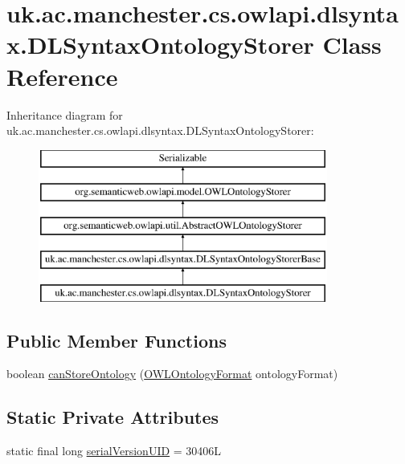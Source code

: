 \hypertarget{classuk_1_1ac_1_1manchester_1_1cs_1_1owlapi_1_1dlsyntax_1_1_d_l_syntax_ontology_storer}{\section{uk.\-ac.\-manchester.\-cs.\-owlapi.\-dlsyntax.\-D\-L\-Syntax\-Ontology\-Storer Class Reference}
\label{classuk_1_1ac_1_1manchester_1_1cs_1_1owlapi_1_1dlsyntax_1_1_d_l_syntax_ontology_storer}
}
Inheritance diagram for uk.\-ac.\-manchester.\-cs.\-owlapi.\-dlsyntax.\-D\-L\-Syntax\-Ontology\-Storer\-:\begin{figure}[H]
\begin{center}
\leavevmode
\includegraphics[height=5.000000cm]{classuk_1_1ac_1_1manchester_1_1cs_1_1owlapi_1_1dlsyntax_1_1_d_l_syntax_ontology_storer}
\end{center}
\end{figure}
\subsection*{Public Member Functions}
\begin{DoxyCompactItemize}
\item 
boolean \hyperlink{classuk_1_1ac_1_1manchester_1_1cs_1_1owlapi_1_1dlsyntax_1_1_d_l_syntax_ontology_storer_a616ec327799c8c32658943720c9edfda}{can\-Store\-Ontology} (\hyperlink{classorg_1_1semanticweb_1_1owlapi_1_1model_1_1_o_w_l_ontology_format}{O\-W\-L\-Ontology\-Format} ontology\-Format)
\end{DoxyCompactItemize}
\subsection*{Static Private Attributes}
\begin{DoxyCompactItemize}
\item 
static final long \hyperlink{classuk_1_1ac_1_1manchester_1_1cs_1_1owlapi_1_1dlsyntax_1_1_d_l_syntax_ontology_storer_aa3428d869db37ac4b38882e694c23ef1}{serial\-Version\-U\-I\-D} = 30406\-L
\end{DoxyCompactItemize}
